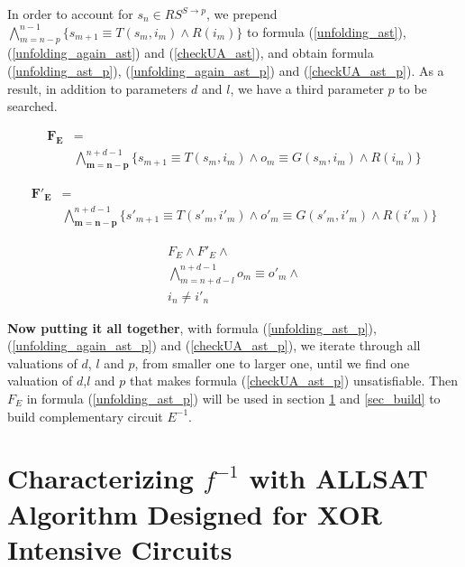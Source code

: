 \documentclass[journal]{IEEEtran}
\begin{document}
In order to account for $s_n\in RS^{S\to p}$,
we prepend $\bigwedge_{m=n-p}^{n-1}\big\{s_{m+1}\equiv T(s_m,i_m)\wedge R(i_m)\big\}$ to formula (\ref{unfolding_ast}),(\ref{unfolding_again_ast}) and (\ref{checkUA_ast}),
and obtain formula (\ref{unfolding_ast_p}), (\ref{unfolding_again_ast_p}) and (\ref{checkUA_ast_p}).
As a result,
in addition to parameters $d$ and $l$,
we have a third parameter $p$ to be searched.

\begin{equation}\label{unfolding_ast_p}
\begin{split}
\boldsymbol{F_E} &= \\
&
\bigwedge_{\boldsymbol{m=n-p}}^{n+d-1}
\Big\{
s_{m+1}\equiv T(s_m,i_m) \wedge
o_m\equiv G(s_m,i_m) \wedge
R (i_m)
\Big\}
\end{split}
\end{equation}

\begin{equation}\label{unfolding_again_ast_p}
\begin{split}
\boldsymbol{F'_E} &= \\
&
\bigwedge_{\boldsymbol{m=n-p}}^{n+d-1}
\Big\{
s'_{m+1}\equiv T(s'_m,i'_m) \wedge
o'_m\equiv G(s'_m,i'_m) \wedge
R (i'_m)
\Big\}
\end{split}
\end{equation}

\begin{equation}\label{checkUA_ast_p}
\begin{array}{c}
F_E\wedge F'_E \wedge \\
\bigwedge_{m=n+d-l}^{n+d-1}o_m\equiv o'_m\wedge \\
i_n\ne i'_n
\end{array}
\end{equation}

\textbf{Now putting it all together},
with formula (\ref{unfolding_ast_p}), (\ref{unfolding_again_ast_p}) and (\ref{checkUA_ast_p}),
we iterate through all valuations of $d$, $l$ and $p$,
from smaller one to larger one,
until we find one valuation of $d$,$l$ and $p$ that makes formula (\ref{checkUA_ast_p}) unsatisfiable.
Then $F_E$ in formula (\ref{unfolding_ast_p}) will be used in section \ref{sec_buildF} and \ref{sec_build} to build complementary circuit $E^{-1}$.

\section{Characterizing $f^{-1}$ with ALLSAT Algorithm Designed for XOR Intensive Circuits}\label{sec_buildF}
\end{document}
